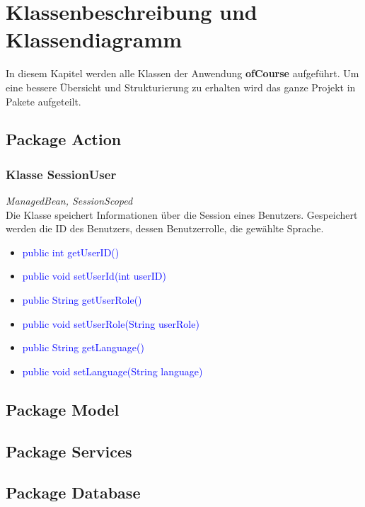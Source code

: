\documentclass[a4paper]{scrreprt}
\begin{document}
	
	\newcommand{\class}[1]{\paragraph{Klasse #1:}\ \\ }
	\newcommand{\method}[1]{\textcolor{blue}{#1}}
	\newcommand{\kursiv}[1]{{\it #1}}
	\newcommand{\override}{{\it @Override}\ \\}
	
	\chapter{Klassenbeschreibung und Klassendiagramm}
	In diesem Kapitel werden alle Klassen der Anwendung \textbf{ofCourse} aufgeführt.
	Um eine bessere Übersicht und Strukturierung zu erhalten wird das ganze Projekt in Pakete aufgeteilt.
	
	\section{Package Action}
	\subsection{Klasse SessionUser}
	\kursiv{ManagedBean, SessionScoped}\\
	Die Klasse speichert Informationen über die Session eines Benutzers. Gespeichert werden die ID des Benutzers, dessen Benutzerrolle, die gewählte Sprache.
	\begin{itemize}
		\item \method{public int getUserID()}
		\item \method{public void setUserId(int userID)}
		\item \method{public String getUserRole()}
		\item \method{public void setUserRole(String userRole)}
		\item \method{public String getLanguage()}
		\item \method{public void setLanguage(String language)}
	\end{itemize}
	
	\section{Package Model}
	\section{Package Services}
	\section{Package Database}
\end{document}
